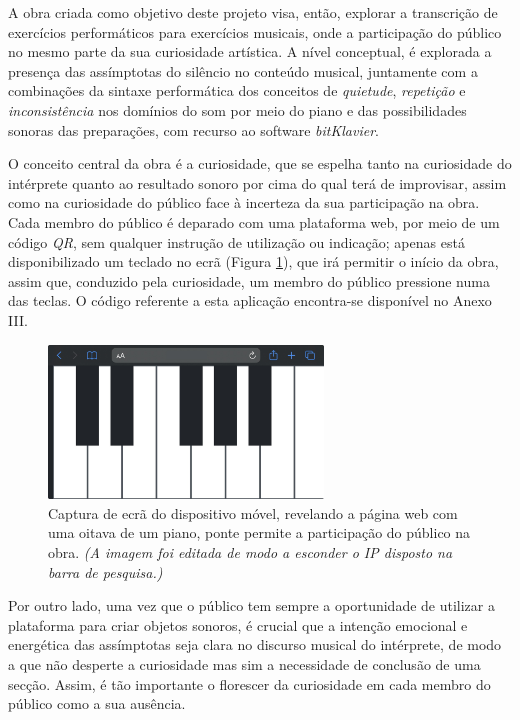 \documentclass[../main.tex]{subfiles}
\begin{document}
A obra criada como objetivo deste projeto visa, então, explorar a transcrição de exercícios performáticos para exercícios musicais, onde a participação do público no mesmo parte da sua curiosidade artística. A nível conceptual, é explorada a presença das assímptotas do silêncio no conteúdo musical, juntamente com a combinações da sintaxe performática dos conceitos de \textsl{quietude}, \textsl{repetição} e \textsl{inconsistência} nos domínios do som por meio do piano e das possibilidades sonoras das preparações, com recurso ao software \textsl{bitKlavier}.

O conceito central da obra é a curiosidade, que se espelha tanto na curiosidade do intérprete quanto ao resultado sonoro por cima do qual terá de improvisar, assim como na curiosidade do público face à incerteza da sua participação na obra. Cada membro do público é deparado com uma plataforma web, por meio de um código \textsl{QR}, sem qualquer instrução de utilização ou indicação; apenas está disponibilizado um teclado no ecrã (Figura \ref{fig:Piano}), que irá permitir o início da obra, assim que, conduzido pela curiosidade, um membro do público pressione numa das teclas. O código referente a esta aplicação encontra-se disponível no Anexo III.

\begin{figure}[h]
    \centering
    \captionsetup{width=0.75\textwidth}
    \includegraphics[width=0.65\textwidth]{images/Piano.jpeg}
    \caption{Captura de ecrã do dispositivo móvel, revelando a página web com uma oitava de um piano, ponte permite a participação do público na obra. \textsl{(A imagem foi editada de modo a esconder o IP disposto na barra de pesquisa.)}}
    \label{fig:Piano}
\end{figure}

Por outro lado, uma vez que o público tem sempre a oportunidade de utilizar a plataforma para criar objetos sonoros, é crucial que a intenção emocional e energética das assímptotas seja clara no discurso musical do intérprete, de modo a que não desperte a curiosidade mas sim a necessidade de conclusão de uma secção. Assim, é tão importante o florescer da curiosidade em cada membro do público como a sua ausência. 
\end{document}
